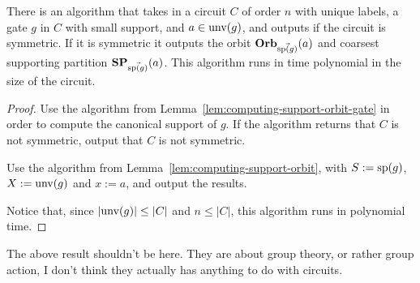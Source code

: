 \documentclass[../paper.tex]{subfiles}
\begin{document}
\begin{lem}
  There is an algorithm that takes in a circuit $C$ of order $n$ with unique
  labels, a gate $g$ in $C$ with small support, and $a \in \text{unv}(g)$, and
  outputs if the circuit is symmetric. If it is symmetric it outputs the orbit
  $\text{\textbf{Orb}}_{\vec{\text{sp}(g)}} (a)$ and coarsest supporting partition
  $\text{\textbf{SP}}_{\vec{\text{sp}(g)}} (a)$. This algorithm runs in time polynomial in the
  size of the circuit.
  \label{lem:computing-support-orbit-index}
\end{lem}
\begin{proof}
  Use the algorithm from Lemma~\ref{lem:computing-support-orbit-gate} in order
  to compute the canonical support of $g$. If the algorithm returns that $C$ is
  not symmetric, output that $C$ is not symmetric.

  Use the algorithm from Lemma~\ref{lem:computing-support-orbit}, with $S :=
  \text{sp}(g)$, $X := \text{unv}(g)$ and $x:= a$, and output the results.

  Notice that, since $\vert \text{unv}(g) \vert \leq \vert C \vert$ and $n \leq
  \vert C \vert$, this algorithm runs in polynomial time.
\end{proof}


  


\begin{remark}
  The above result shouldn't be here. They are about group theory, or rather
  group action, I don't think they actually has anything to do with circuits.
\end{remark}
\end{document}
